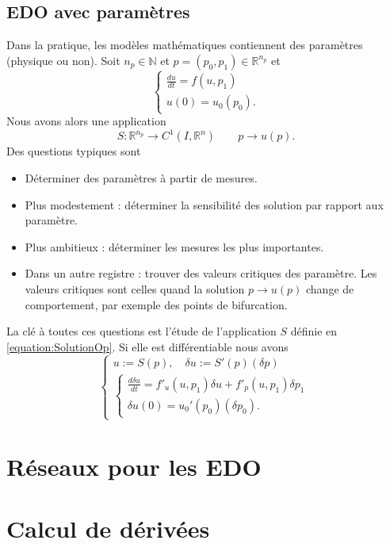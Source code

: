\documentclass[11pt,a4paper]{article}
\newcommand{\N}{\mathbb N}
\newcommand{\R}{\mathbb R}
\begin{document}
\subsection{EDO avec paramètres}\label{subsec:}
%
Dans la pratique, les modèles mathématiques contiennent des paramètres (physique ou non). Soit $n_p\in\N$ et $p=(p_0,p_1)\in \R^{n_p}$ et
%
\begin{equation}\label{equation:EDOParam}
\left\{
\begin{aligned}
\frac{du}{dt} = f(u,p_1)\\
u(0) = u_0(p_0).
\end{aligned}
\right.
\end{equation}
%
Nous avons alors une application
%
\begin{equation}\label{equation:SolutionOp}
S:\R^{n_p}\to C^1(I,\R^n)\qquad p \to u(p).
\end{equation}
%
%
Des questions typiques sont
\begin{itemize}
\item Déterminer des paramètres à partir de mesures.
\item Plus modestement : déterminer la sensibilité des solution par rapport aux paramètre.
\item Plus ambitieux : déterminer les mesures les plus importantes.
\item Dans un autre registre : trouver des valeurs critiques des paramètre. Les valeurs critiques sont celles quand la solution $p\to u(p)$ change de comportement, par exemple des points de bifurcation.
\end{itemize}
%
La clé à toutes ces questions est l'étude de l'application $S$ définie en \eqref{equation:SolutionOp}. 
Si elle est différentiable nous avons
%
\begin{equation}\label{equation:}
\left\{
\begin{aligned}
u:= S(p), \quad \delta u := S'(p)(\delta p)\\
%
\left\{
\begin{aligned}
\frac{d\delta u}{dt} = f'_u(u,p_1)\delta u + f'_p(u,p_1)\delta p_1\\
\delta u(0) = u_0'(p_0)(\delta p_0).
\end{aligned}
\right.
%
\end{aligned}
\right.
\end{equation}
%
%
\section{Réseaux pour les EDO}\label{sec:}
%
%
\section{Calcul de dérivées}\label{sec:}
%
%



\end{document}
